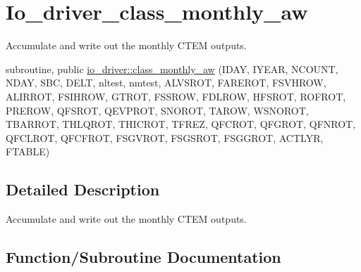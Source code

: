 \hypertarget{group__io__driver__class__monthly__aw}{}\section{Io\+\_\+driver\+\_\+class\+\_\+monthly\+\_\+aw}
\label{group__io__driver__class__monthly__aw}


Accumulate and write out the monthly C\+T\+E\+M outputs.  


\begin{DoxyCompactItemize}
\item 
subroutine, public \hyperlink{group__io__driver__class__monthly__aw_ga58c2e12621635a74096a8f7c142f85de}{io\+\_\+driver\+::class\+\_\+monthly\+\_\+aw} (I\+D\+A\+Y, I\+Y\+E\+A\+R, N\+C\+O\+U\+N\+T, N\+D\+A\+Y, S\+B\+C, D\+E\+L\+T, nltest, nmtest, A\+L\+V\+S\+R\+O\+T, F\+A\+R\+E\+R\+O\+T, F\+S\+V\+H\+R\+O\+W, A\+L\+I\+R\+R\+O\+T, F\+S\+I\+H\+R\+O\+W, G\+T\+R\+O\+T, F\+S\+S\+R\+O\+W, F\+D\+L\+R\+O\+W, H\+F\+S\+R\+O\+T, R\+O\+F\+R\+O\+T, P\+R\+E\+R\+O\+W, Q\+F\+S\+R\+O\+T, Q\+E\+V\+P\+R\+O\+T, S\+N\+O\+R\+O\+T, T\+A\+R\+O\+W, W\+S\+N\+O\+R\+O\+T, T\+B\+A\+R\+R\+O\+T, T\+H\+L\+Q\+R\+O\+T, T\+H\+I\+C\+R\+O\+T, T\+F\+R\+E\+Z, Q\+F\+C\+R\+O\+T, Q\+F\+G\+R\+O\+T, Q\+F\+N\+R\+O\+T, Q\+F\+C\+L\+R\+O\+T, Q\+F\+C\+F\+R\+O\+T, F\+S\+G\+V\+R\+O\+T, F\+S\+G\+S\+R\+O\+T, F\+S\+G\+G\+R\+O\+T, A\+C\+T\+L\+Y\+R, F\+T\+A\+B\+L\+E)
\end{DoxyCompactItemize}


\subsection{Detailed Description}
Accumulate and write out the monthly C\+T\+E\+M outputs. 



\subsection{Function/\+Subroutine Documentation}
\hypertarget{group__io__driver__class__monthly__aw_ga58c2e12621635a74096a8f7c142f85de}{}
